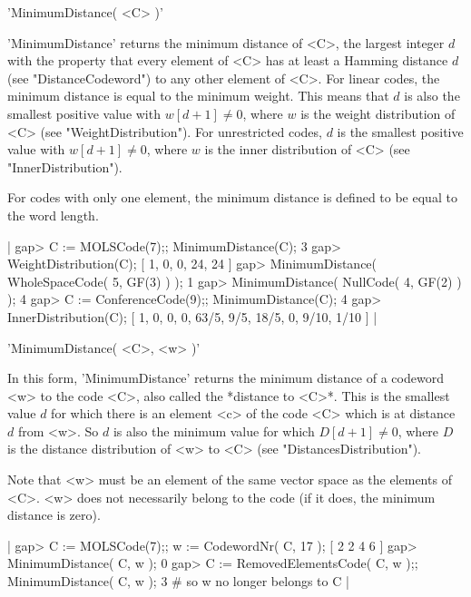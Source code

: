 'MinimumDistance( <C> )'

'MinimumDistance'  returns  the  minimum distance   of  <C>, the  largest
integer $d$ with the  property that every element of  <C> has at least  a
Hamming  distance  $d$ (see "DistanceCodeword")  to  any other element of
<C>.  For linear  codes, the  minimum distance is   equal to  the minimum
weight. This  means that  $d$ is also  the  smallest positive value  with
$w[d+1]  \neq 0$,   where $w$ is   the  weight distribution  of  <C> (see
"WeightDistribution").  For unrestricted    codes,  $d$ is  the  smallest
positive value with $w[d+1] \neq 0$, where $w$  is the inner distribution
of <C> (see "InnerDistribution").

For  codes with only  one element, the  minimum distance is defined to be
equal to the word length.

|    gap> C := MOLSCode(7);; MinimumDistance(C);
    3
    gap> WeightDistribution(C);
    [ 1, 0, 0, 24, 24 ]
    gap> MinimumDistance( WholeSpaceCode( 5, GF(3) ) );
    1
    gap> MinimumDistance( NullCode( 4, GF(2) ) );
    4
    gap> C := ConferenceCode(9);; MinimumDistance(C);
    4
    gap> InnerDistribution(C);
    [ 1, 0, 0, 0, 63/5, 9/5, 18/5, 0, 9/10, 1/10 ] |

'MinimumDistance( <C>, <w> )'

In  this  form, 'MinimumDistance'  returns   the  minimum  distance of  a
codeword <w> to the code <C>, also called the *distance  to <C>*. This is
the smallest value $d$ for which there is an element <c>  of the code <C>
which is at distance $d$ from <w>.  So $d$ is also  the minimum value for
which $D[d+1] \neq  0$, where $D$ is  the distance distribution of <w> to
<C> (see "DistancesDistribution").

Note that <w> must be an element of the same vector space as the elements
of <C>.  <w> does not necessarily belong  to  the code  (if it  does, the
minimum distance is zero).

|    gap> C := MOLSCode(7);; w := CodewordNr( C, 17 );
    [ 2 2 4 6 ]
    gap> MinimumDistance( C, w );
    0
    gap> C := RemovedElementsCode( C, w );; MinimumDistance( C, w );
    3                           # so w no longer belongs to C |

%
%
%
%
%

